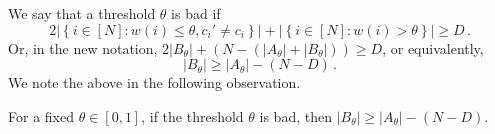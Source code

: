 \documentclass{article}
\def\abs#1{\left| #1 \right|}
\begin{document}
	We say that a threshold $\theta$ is bad if
	\[
	2\left| \left\{ i \in [N] \colon  w(i) \leq \theta, c_i' \neq c_i \right\} \right| + \left| \left\{ i \in [N] \colon  w(i) > \theta \right\} \right| \geq D \, .
	\]
	Or, in the new notation, $2| B_{\theta}| + (N - (|A_\theta| + |B_{\theta}|)) \geq D$, or equivalently,  
	\[
	\abs{B_{\theta}} \geq \abs{A_{\theta}} - (N-D) \, .
	\]
	We note the above in the following observation.
	
	\begin{observation} \label{obs:undecodable}
		For a fixed $\theta \in [0,1]$, if the threshold $\theta$ is bad, then $\abs{B_{\theta}} \geq \abs{A_{\theta}} - (N-D)$.
	\end{observation}
	
\end{document}
